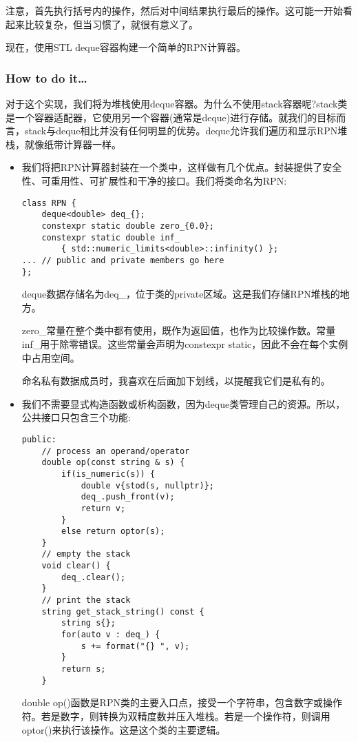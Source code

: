 注意，首先执行括号内的操作，然后对中间结果执行最后的操作。这可能一开始看起来比较复杂，但当习惯了，就很有意义了。

现在，使用STL deque容器构建一个简单的RPN计算器。

\subsubsection{How to do it…}

对于这个实现，我们将为堆栈使用deque容器。为什么不使用stack容器呢?stack类是一个容器适配器，它使用另一个容器(通常是deque)进行存储。就我们的目标而言，stack与deque相比并没有任何明显的优势。deque允许我们遍历和显示RPN堆栈，就像纸带计算器一样。

\begin{itemize}
\item 
我们将把RPN计算器封装在一个类中，这样做有几个优点。封装提供了安全性、可重用性、可扩展性和干净的接口。我们将类命名为RPN:

\begin{lstlisting}[style=styleCXX]
class RPN {
	deque<double> deq_{};
	constexpr static double zero_{0.0};
	constexpr static double inf_
		{ std::numeric_limits<double>::infinity() };
... // public and private members go here
};
\end{lstlisting}

deque数据存储名为deq\_，位于类的private区域。这是我们存储RPN堆栈的地方。

zero\_常量在整个类中都有使用，既作为返回值，也作为比较操作数。常量inf\_用于除零错误。这些常量会声明为constexpr static，因此不会在每个实例中占用空间。

命名私有数据成员时，我喜欢在后面加下划线，以提醒我它们是私有的。

\item 
我们不需要显式构造函数或析构函数，因为deque类管理自己的资源。所以，公共接口只包含三个功能:

\begin{lstlisting}[style=styleCXX]
public:
	// process an operand/operator
	double op(const string & s) {
		if(is_numeric(s)) {
			double v{stod(s, nullptr)};
			deq_.push_front(v);
			return v;
		}
		else return optor(s);
	}
	// empty the stack
	void clear() {
		deq_.clear();
	}
	// print the stack
	string get_stack_string() const {
		string s{};
		for(auto v : deq_) {
			s += format("{} ", v);
		}
		return s;
	}
\end{lstlisting}

double op()函数是RPN类的主要入口点，接受一个字符串，包含数字或操作符。若是数字，则转换为双精度数并压入堆栈。若是一个操作符，则调用optor()来执行该操作。这是这个类的主要逻辑。


\end{itemize}
